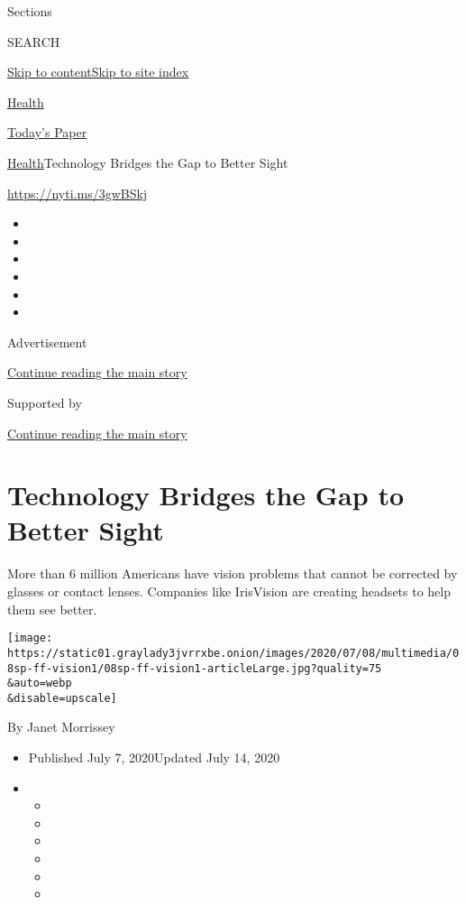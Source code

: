 Sections

SEARCH

\protect\hyperlink{site-content}{Skip to
content}\protect\hyperlink{site-index}{Skip to site index}

\href{https://www.nytimes3xbfgragh.onion/section/health}{Health}

\href{https://myaccount.nytimes3xbfgragh.onion/auth/login?response_type=cookie\&client_id=vi}{}

\href{https://www.nytimes3xbfgragh.onion/section/todayspaper}{Today's
Paper}

\href{/section/health}{Health}\textbar{}Technology Bridges the Gap to
Better Sight

\url{https://nyti.ms/3gwBSkj}

\begin{itemize}
\item
\item
\item
\item
\item
\item
\end{itemize}

Advertisement

\protect\hyperlink{after-top}{Continue reading the main story}

Supported by

\protect\hyperlink{after-sponsor}{Continue reading the main story}

\hypertarget{technology-bridges-the-gap-to-better-sight}{%
\section{Technology Bridges the Gap to Better
Sight}\label{technology-bridges-the-gap-to-better-sight}}

More than 6 million Americans have vision problems that cannot be
corrected by glasses or contact lenses. Companies like IrisVision are
creating headsets to help them see better.

\texttt{[image: https://static01.graylady3jvrrxbe.onion/images/2020/07/08/multimedia/08sp-ff-vision1/08sp-ff-vision1-articleLarge.jpg?quality=75\\\&auto=webp\\\&disable=upscale]}

By Janet Morrissey

\begin{itemize}
\item
  Published July 7, 2020Updated July 14, 2020
\item
  \begin{itemize}
  \item
  \item
  \item
  \item
  \item
  \item
  \end{itemize}
\end{itemize}

